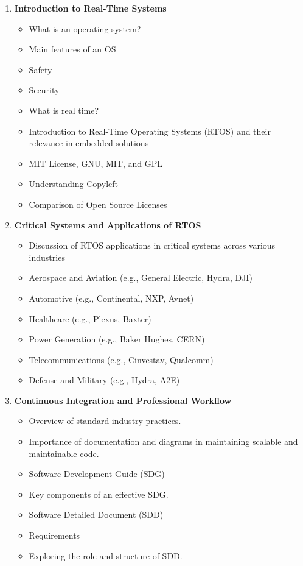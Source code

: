 \begin{enumerate}[label=\textbf{Week \arabic*:}]
\item \textbf{ Introduction to Real-Time Systems }
\begin{itemize}
  \item What is an operating system?
  \item Main features of an OS
  \item Safety
  \item Security
  \item What is real time?
  \item Introduction to Real-Time Operating Systems (RTOS) and their relevance in embedded solutions
  \item MIT License, GNU, MIT, and GPL
  \item Understanding Copyleft
  \item Comparison of Open Source Licenses
\end{itemize}
\item \textbf{ Critical Systems and Applications of RTOS }
\begin{itemize}
  \item Discussion of RTOS applications in critical systems across various industries
  \item Aerospace and Aviation (e.g., General Electric, Hydra, DJI)
  \item Automotive (e.g., Continental, NXP, Avnet)
  \item Healthcare (e.g., Plexus, Baxter)
  \item Power Generation (e.g., Baker Hughes, CERN)
  \item Telecommunications (e.g., Cinvestav, Qualcomm)
  \item Defense and Military (e.g., Hydra, A2E)
\end{itemize}
\item \textbf{ Continuous Integration and Professional Workflow }
\begin{itemize}
  \item Overview of standard industry practices.
  \item Importance of documentation and diagrams in maintaining scalable and maintainable code.
  \item Software Development Guide (SDG)
  \item Key components of an effective SDG.
  \item Software Detailed Document (SDD)
  \item Requirements
  \item Exploring the role and structure of SDD.

\end{itemize}
\end{enumerate}
